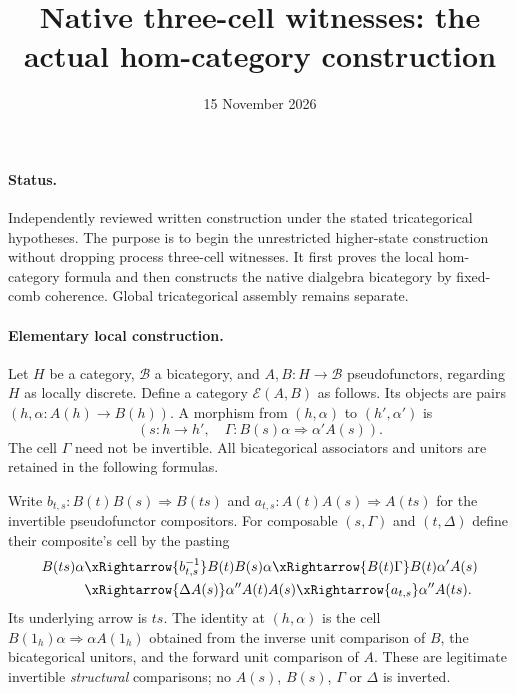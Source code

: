 \documentclass{article}
\title{Native three-cell witnesses: the actual hom-category construction}
\date{15 November 2026}
\begin{document}
\maketitle
\paragraph{Status.} Independently reviewed written construction under the stated tricategorical hypotheses. The purpose is to begin the unrestricted higher-state construction without dropping process three-cell witnesses. It first proves the local hom-category formula and then constructs the native dialgebra bicategory by fixed-comb coherence. Global tricategorical assembly remains separate.

\paragraph{Elementary local construction.} Let $H$ be a category, $\mathcal B$ a bicategory, and $A,B:H\to\mathcal B$ pseudofunctors, regarding $H$ as locally discrete. Define a category $\mathcal E(A,B)$ as follows. Its objects are pairs $(h,\alpha:A(h)\to B(h))$. A morphism from $(h,\alpha)$ to $(h',\alpha')$ is
\[
 (s:h\to h',\quad \Gamma:B(s)\alpha\Rightarrow\alpha'A(s)).
\]
The cell $\Gamma$ need not be invertible. All bicategorical associators and unitors are retained in the following formulas.

Write $b_{t,s}:B(t)B(s)\Rightarrow B(ts)$ and $a_{t,s}:A(t)A(s)\Rightarrow A(ts)$ for the invertible pseudofunctor compositors. For composable $(s,\Gamma)$ and $(t,\Delta)$ define their composite's cell by the pasting
\[
\begin{aligned}
 B(ts)\alpha
 &\xRightarrow{b_{t,s}^{-1}} B(t)B(s)\alpha
 \xRightarrow{B(t)\Gamma}B(t)\alpha'A(s)\\
 &\xRightarrow{\Delta A(s)}\alpha''A(t)A(s)
 \xRightarrow{a_{t,s}}\alpha''A(ts).
\end{aligned}
\]
Its underlying arrow is $ts$. The identity at $(h,\alpha)$ is the cell $B(1_h)\alpha\Rightarrow\alpha A(1_h)$ obtained from the inverse unit comparison of $B$, the bicategorical unitors, and the forward unit comparison of $A$. These are legitimate invertible \emph{structural} comparisons; no $A(s)$, $B(s)$, $\Gamma$ or $\Delta$ is inverted.
\end{document}
